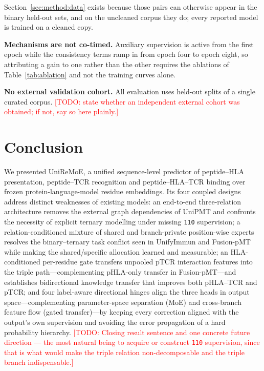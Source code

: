 \documentclass[webpdf,modern,large,namedate]{oup-authoring-template}
\theoremstyle{thmstyleone}
\theoremstyle{thmstyletwo}
\theoremstyle{thmstylethree}
\DeclareRobustCommand{\TODO}[1]{\textcolor{red}{[TODO: #1]}}
\newcommand{\method}{UniReMoE}
\newcommand{\PH}{pHLA}
\newcommand{\PT}{pTCR}
\newcommand{\PHT}{pHLA--TCR}
\begin{document}
\begin{boxtext}[Limitations]
\begin{unlist}
Section~\ref{sec:method:data} exists because those pairs can otherwise appear
in the binary held-out sets, and on the uncleaned corpus they do; every
reported model is trained on a cleaned copy.
\item \textbf{Mechanisms are not co-timed.} Auxiliary supervision is active
from the first epoch while the consistency terms ramp in from epoch four to
epoch eight, so attributing a gain to one rather than the other requires the
ablations of Table~\ref{tab:ablation} and not the training curves alone.
\item \textbf{No external validation cohort.} All evaluation uses held-out
splits of a single curated corpus. \TODO{state whether an independent
external cohort was obtained; if not, say so here plainly.}
\end{unlist}
\end{boxtext}

\section{Conclusion}\label{sec:conclusion}

We presented \method{}, a unified sequence-level predictor of peptide--HLA
presentation, peptide--TCR recognition and peptide--HLA--TCR binding over
frozen protein-language-model residue embeddings. Its four coupled designs
address distinct weaknesses of existing models: an end-to-end three-relation
architecture removes the external graph dependencies of UniPMT and confronts
the necessity of explicit ternary modelling under missing \texttt{110}
supervision; a relation-conditioned mixture of shared and branch-private
position-wise experts resolves the binary--ternary task conflict seen in
UnifyImmun and Fusion-pMT while making the shared/specific allocation learned
and measurable; an HLA-conditioned per-residue gate transfers unpooled \PT{} interaction
features into the triple path---complementing \PH{}-only transfer in
Fusion-pMT---and establishes bidirectional knowledge transfer that improves
both \PHT{} and \PT{};
and four label-aware directional hinges align the three heads in output
space---complementing parameter-space separation (MoE) and cross-branch feature
flow (gated transfer)---by keeping every correction aligned with the output's
own supervision and avoiding the error propagation of a hard probability
hierarchy.
\TODO{Closing result sentence and one concrete future direction --- the most
natural being to acquire or construct \texttt{110} supervision, since that is
what would make the triple relation non-decomposable and the triple branch
indispensable.}
\end{document}
